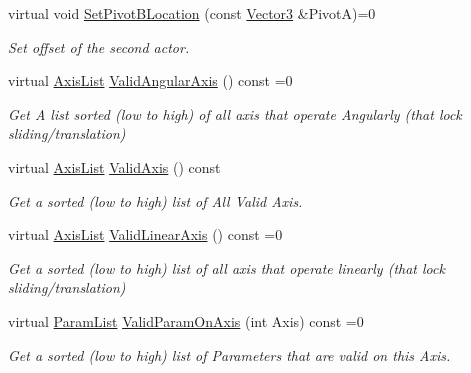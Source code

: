 \begin{DoxyCompactItemize}
virtual void \hyperlink{classMezzanine_1_1TypedConstraint_ad59aa55a0e4b8aa107db9c9460b57ec3}{SetPivotBLocation} (const \hyperlink{classMezzanine_1_1Vector3}{Vector3} \&PivotA)=0
\begin{DoxyCompactList}\small\item\em Set offset of the second actor. \item\end{DoxyCompactList}\item 
virtual \hyperlink{classMezzanine_1_1TypedConstraint_ac6b8e0839cd686f73d0c9e9ad5db47a4}{AxisList} \hyperlink{classMezzanine_1_1TypedConstraint_a09ecca761c4af51a8b41c056f6b15b30}{ValidAngularAxis} () const =0
\begin{DoxyCompactList}\small\item\em Get A list sorted (low to high) of all axis that operate Angularly (that lock sliding/translation) \item\end{DoxyCompactList}\item 
virtual \hyperlink{classMezzanine_1_1TypedConstraint_ac6b8e0839cd686f73d0c9e9ad5db47a4}{AxisList} \hyperlink{classMezzanine_1_1TypedConstraint_a6fa3f1ead5840ca22071c5f7dce30bbd}{ValidAxis} () const 
\begin{DoxyCompactList}\small\item\em Get a sorted (low to high) list of All Valid Axis. \item\end{DoxyCompactList}\item 
virtual \hyperlink{classMezzanine_1_1TypedConstraint_ac6b8e0839cd686f73d0c9e9ad5db47a4}{AxisList} \hyperlink{classMezzanine_1_1TypedConstraint_aa9cc59688e58329ce18cc3e024094602}{ValidLinearAxis} () const =0
\begin{DoxyCompactList}\small\item\em Get a sorted (low to high) list of all axis that operate linearly (that lock sliding/translation) \item\end{DoxyCompactList}\item 
virtual \hyperlink{classMezzanine_1_1TypedConstraint_abd499db29c9e9755e9bb547d29eaa49a}{ParamList} \hyperlink{classMezzanine_1_1TypedConstraint_a3f895880ea78984a088996e1950fddcc}{ValidParamOnAxis} (int Axis) const =0
\begin{DoxyCompactList}\small\item\em Get a sorted (low to high) list of Parameters that are valid on this Axis. \item\end{DoxyCompactList}\item 

\end{DoxyCompactItemize}
